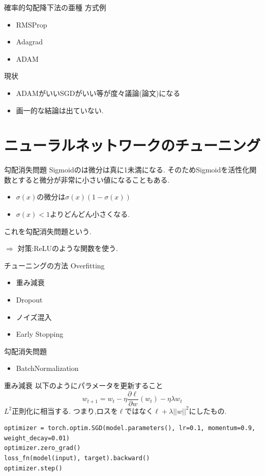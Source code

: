 \begin{frame}[fragile]{確率的勾配降下法の亜種}
方式例
\begin{itemize}
  \item RMSProp
  \item Adagrad
  \item ADAM
\end{itemize}
現状
\begin{itemize}
  \item ADAMがいいSGDがいい等が度々議論(論文)になる
  \item 画一的な結論は出ていない.
\end{itemize}
\end{frame}

\section{ニューラルネットワークのチューニング}

\begin{frame}{勾配消失問題}
Sigmoidのは微分は真に1未満になる.
そのためSigmoidを活性化関数とすると微分が非常に小さい値になることもある.
\begin{itemize}
  \item  $\sigma(x)$の微分は$\sigma(x)(1 - \sigma(x))$
  \item $\sigma(x) < 1$よりどんどん小さくなる.
\end{itemize}
これを勾配消失問題という. 

$\Rightarrow$ 対策:ReLUのような関数を使う.
\end{frame}


\begin{frame}[fragile]{チューニングの方法}
Overfitting
\begin{itemize}
  \item 重み減衰
  \item Dropout
  \item ノイズ混入
  \item Early Stopping
\end{itemize}
勾配消失問題
\begin{itemize}
  \item BatchNormalization
\end{itemize}
\end{frame}


\begin{frame}[fragile]{重み減衰}
以下のようにパラメータを更新すること
\begin{equation*}
  w_{t+1} =  w_{t} - \eta \frac{\partial \ell}{\partial w}(w_t) - \eta \lambda w_t
\end{equation*}
$L^2$正則化に相当する.
つまり,ロスを$\ell$ではなく$\ell + \lambda ||w||^2$にしたもの.

\begin{verbatim}
optimizer = torch.optim.SGD(model.parameters(), lr=0.1, momentum=0.9, weight_decay=0.01)
optimizer.zero_grad()
loss_fn(model(input), target).backward()
optimizer.step()
\end{verbatim}
\end{frame}


